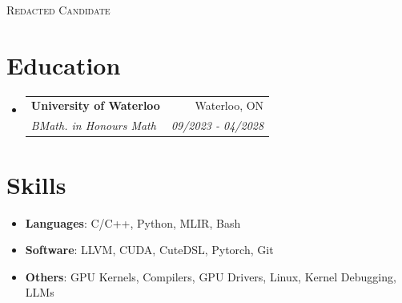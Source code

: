 \documentclass[letterpaper,11pt]{article}
\makeatletter
\newcommand{\resumeSubheading}[4]{
    \vspace{-3pt}
    \item
    \begin{tabular*}{0.98\textwidth}{@{}l@{\extracolsep{\fill}}r@{}}
      \vspace{-3pt} \textbf{#1} & #2 \\
      \textit{\small #3} & \textit{\footnotesize #4} \\
    \end{tabular*}\vspace{-4pt}
}
\newcommand{\resumeSubHeadingListStart}{\begin{itemize}[leftmargin=0.13in, label={}]}
\newcommand{\resumeSubHeadingListEnd}{\end{itemize}}
\makeatother
\begin{document}
\begin{center}{\Huge\scshape Redacted Candidate}\end{center}
\section{Education}
  \resumeSubHeadingListStart
    \resumeSubheading
      {University of Waterloo}{Waterloo, ON}
      {BMath. in Honours Math}{09/2023 - 04/2028}
  \resumeSubHeadingListEnd



\vspace{-5pt}
\section{Skills}
 \begin{itemize}[leftmargin=0.08in, label={}]
    \vspace{-3pt}\setlength\itemsep{-6pt}
    \item{\small{
        \textbf{Languages}{: C/C++, Python, MLIR, Bash}
     }}
    \item{\small{
        \textbf{Software}{: LLVM, CUDA, CuteDSL, Pytorch, Git}
    }}
    \item{\small{
        \textbf{Others}{: GPU Kernels, Compilers, GPU Drivers, Linux, Kernel Debugging, LLMs}
    }}
 \end{itemize}


\vspace{-10pt}
\end{document}
